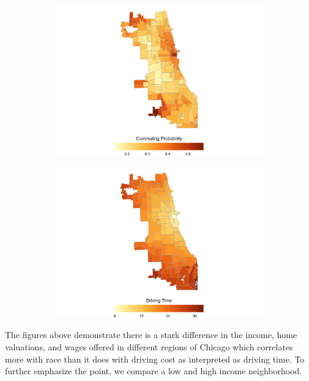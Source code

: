 \documentclass[12pt]{article}
\begin{document}
\begin{figure}[h!]
\centering
    \caption{Commuting Probability and Driving Time}
    \begin{subfigure}{0.49\textwidth}
         \centering
         \includegraphics[width=\textwidth]{Pset1/code/lodes_diagnostics_files/figure-html/unnamed-chunk-7-1.png}
    \end{subfigure}  
    \begin{subfigure}{0.49\textwidth}
         \centering
         \includegraphics[width=\linewidth]{Pset1/code/lodes_diagnostics_files/figure-html/unnamed-chunk-9-1.png}
    \end{subfigure}
    \label{fig:commute_time}
\end{figure}
The figures above demonstrate there is a stark difference in the income, home valuations, and wages offered in different regions of Chicago which correlates more with race than it does with driving cost as interpreted as driving time. To further emphasize the point, we compare a low and high income neighborhood.  
\end{document}
